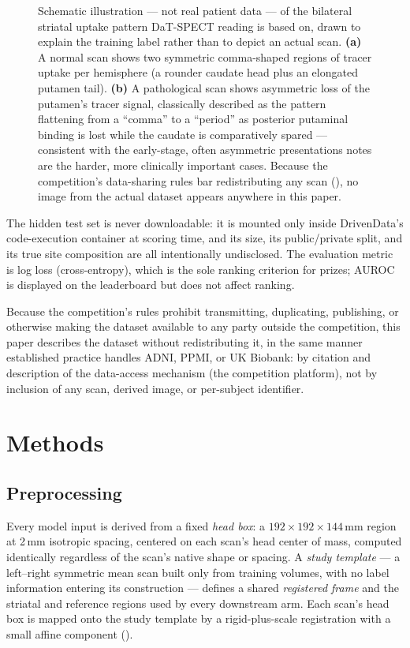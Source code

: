 \documentclass[11pt]{article}
\begin{document}
\begin{figure}[t]
\centering

\caption{Schematic illustration --- not real patient data --- of the bilateral striatal uptake pattern DaT-SPECT reading is based on, drawn to explain the training label rather than to depict an actual scan. \textbf{(a)} A normal scan shows two symmetric comma-shaped regions of tracer uptake per hemisphere (a rounder caudate head plus an elongated putamen tail). \textbf{(b)} A pathological scan shows asymmetric loss of the putamen's tracer signal, classically described as the pattern flattening from a ``comma'' to a ``period'' as posterior putaminal binding is lost while the caudate is comparatively spared --- consistent with the early-stage, often asymmetric presentations  notes are the harder, more clinically important cases. Because the competition's data-sharing rules bar redistributing any scan (), no image from the actual dataset appears anywhere in this paper.}
\label{fig:schematic}
\end{figure}

The hidden test set is never downloadable: it is mounted only inside DrivenData's code-execution container at scoring time, and its size, its public/private split, and its true site composition are all intentionally undisclosed. The evaluation metric is log loss (cross-entropy), which is the sole ranking criterion for prizes; AUROC is displayed on the leaderboard but does not affect ranking.

Because the competition's rules prohibit transmitting, duplicating, publishing, or otherwise making the dataset available to any party outside the competition, this paper describes the dataset without redistributing it, in the same manner established practice handles ADNI, PPMI, or UK Biobank: by citation and description of the data-access mechanism (the competition platform), not by inclusion of any scan, derived image, or per-subject identifier.

\section{Methods}
\label{sec:methods}

\subsection{Preprocessing}
\label{sec:preprocessing}

Every model input is derived from a fixed \emph{head box}: a $192\times192\times144$\,mm region at 2\,mm isotropic spacing, centered on each scan's head center of mass, computed identically regardless of the scan's native shape or spacing. A \emph{study template} --- a left--right symmetric mean scan built only from training volumes, with no label information entering its construction --- defines a shared \emph{registered frame} and the striatal and reference regions used by every downstream arm. Each scan's head box is mapped onto the study template by a rigid-plus-scale registration with a small affine component ().
\end{document}
